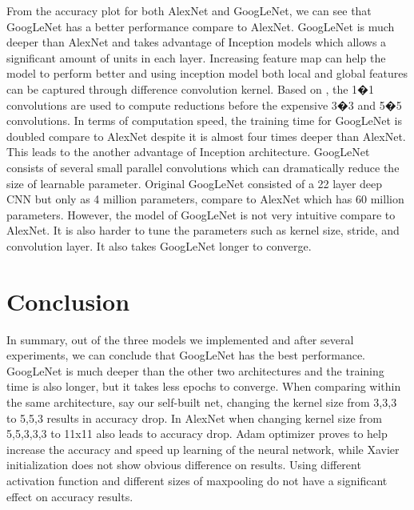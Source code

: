 \documentclass{article} %
\begin{document}
From the accuracy plot for both AlexNet and GoogLeNet, we can see that GoogLeNet has a better performance compare to AlexNet. GoogLeNet is much deeper than AlexNet and takes advantage of Inception models which allows a significant amount of units in each layer. Increasing feature map can help the model to perform better and using inception model both local and global features can be captured through difference convolution kernel. Based on \cite{Googlenet}, the 1�1 convolutions are used to compute reductions before the expensive 3�3 and 5�5 convolutions. 
In terms of computation speed, the training time for GoogLeNet is doubled compare to AlexNet despite it is almost four times deeper than AlexNet. This leads to the another advantage of Inception architecture. GoogLeNet consists of several small parallel convolutions which can dramatically reduce the size of learnable parameter. Original GoogLeNet consisted of a 22 layer deep CNN but only as 4 million parameters, compare to AlexNet which has 60 million parameters. 
However, the model of GoogLeNet is not very intuitive compare to AlexNet. It is also harder to tune the parameters such as kernel size, stride, and convolution layer. It also takes GoogLeNet longer to converge.


\section{Conclusion}
In summary, out of the three models we implemented and after several experiments, we can conclude that GoogLeNet has the best performance. GoogLeNet is much deeper than the other two architectures and the training time is also longer, but it takes less epochs to converge. When comparing within the same architecture, say our self-built net, changing the kernel size from 3,3,3 to 5,5,3 results in accuracy drop. In AlexNet when changing kernel size from 5,5,3,3,3 to 11x11 also leads to accuracy drop. Adam optimizer proves to help increase the accuracy and speed up learning of the neural network, while Xavier initialization does not show obvious difference on results. Using different activation function and different sizes of maxpooling do not have a significant effect on accuracy results. 

\end{document}
